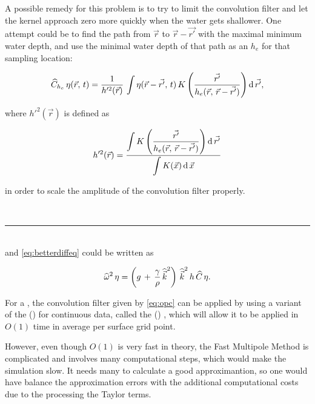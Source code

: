 A possible remedy for this problem is to try to limit the convolution filter and let the kernel approach zero more quickly when the water gets shallower. One attempt could be to find the path from $\vec{r}$ to $\vec{r}-\vec{r'}$ with the maximal minimum water depth, and use the minimal water depth of that path as an  $h_e$ for that sampling location:

\begin{equation} \label{eq:opcmoresophisticated}
\widehat{C}_{h_e}\,\eta(\vec{r},\,t) = \frac{1}{h'^2(\vec{r})}\,\int\eta(\vec{r}-\vec{r'},\,t)\,K\left(\frac{\vec{r'}}{h_e(\vec{r},\,\vec{r}-\vec{r'})}\right) \operatorname{d}\vec{r'},
\end{equation}

where $h'^2(\vec{r})$ is defined as 

\begin{equation} \label{eq:hsqreffective}
h'^2(\vec{r}) = \frac{\displaystyle\int K\left(\frac{\vec{r'}}{h_e(\vec{r},\,\vec{r}-\vec{r'})}\right) \operatorname{d}\vec{r'}}{\displaystyle\int K(\vec{x}) \operatorname{d}\vec{x}}
\end{equation}

in order to scale the amplitude of the convolution filter properly.

\ \\
\hrule{}
\ \\

and \eqref{eq:betterdiffeq} could be written as

\begin{equation} \label{eq:bestdiffeq}
\widehat{\omega}^2\,\eta = \left(g\,+\,\frac{\gamma}{\rho}\,{\widehat{\vec{k}}}^2\right)\,{\widehat{\vec{k}}}^2\,h\,\widehat{C}\,\eta.
\end{equation}

For a , the convolution filter given by \eqref{eq:opc} can be applied by using a variant of the  () \citep{Rokhlin1985,Greengard1987} for continuous data, called the  () \citep{White1994,White1996}, which will allow it to be applied in $O(1)$ time in average per surface grid point.

However, even though $O(1)$ is very fast in theory, the Fast Multipole Method is complicated and involves many computational steps, which would make the simulation slow. It needs many  to calculate a good approximantion, so one would have balance the approximation errors with the additional computational costs due to the processing the Taylor terms.

